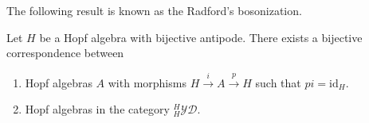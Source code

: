 \documentclass[12pt]{amsproc}
\begin{document}
The following result is known as the Radford's bosonization. 

\begin{theorem}[Radford]
\label{theorem:bosonization}
Let $H$ be a Hopf algebra with bijective antipode. There exists a bijective
correspondence between
\begin{enumerate}
\item Hopf algebras $A$ with morphisms $H\xrightarrow{i}A\xrightarrow{p}H$
such that $pi=\textrm{id}_{H}$.
\item Hopf algebras in the category $_{H}^{H}\mathcal{YD}$.
\end{enumerate}
\end{theorem}
\end{document}
